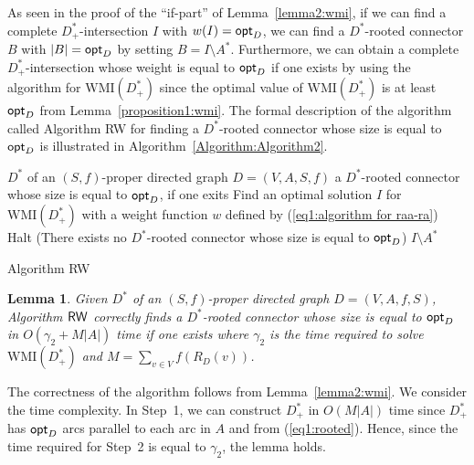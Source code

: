\documentclass[11pt]{article}
\newcounter{ni}
\theoremstyle{plain}
\newtheorem{lemma}[theorem]{Lemma}\newtheorem{corollary}[theorem]{Corollary}\newtheorem{definition}[theorem]{Definition}\newtheorem{proposition}[theorem]{Proposition}\newtheorem{claim}[theorem]{Claim}\newtheorem{fact}[theorem]{Fact}\newtheorem{example}{Example}
\newcommand{\eop}{\hfill \usebox{\ProofSym}}
\newenvironment{proof}{\noindent {\it Proof.}}{\eop\par\vspace{0.3cm}}
\begin{document}
As seen in the proof of the ``if-part'' of Lemma~\ref{lemma2:wmi}, 
if we can find a complete $D_+^{\ast}$-intersection $I$ 
with $w(I) = {\sf opt}_D$, we can find 
a $D^{\ast}$-rooted connector $B$ with $|B|={\sf opt}_D$ 
by setting $B=I\setminus A^{\ast}$. 
Furthermore, we can obtain a complete $D_+^{\ast}$-intersection 
whose weight is equal to ${\sf opt}_D$ if one exists by using the algorithm for $\mbox{WMI}(D_+^{\ast})$
since the optimal value of $\mbox{WMI}(D_+^{\ast})$ is at least ${\sf opt}_D$ 
from Lemma~\ref{proposition1:wmi}. The formal description of the algorithm 
called Algorithm {\sf RW}
for finding a $D^{\ast}$-rooted connector whose size is equal to ${\sf opt}_D$
is illustrated in Algorithm~\ref{Algorithm:Algorithm2}.

\begin{algorithm}[h]
\begin{algorithmic}[1]
\INPUT $D^{\ast}$ of an $(S,f)$-proper directed graph  $D=(V,A,S,f)$
\OUTPUT a $D^{\ast}$-rooted connector whose size is equal to ${\sf opt}_D$, if one exits
\STATE Find an optimal solution $I$ for $\mbox{WMI}(D_+^{\ast})$ 
with a weight function $w$ defined by (\ref{eq1:algorithm for raa-ra})\\
\STATE Halt (There exists no $D^{\ast}$-rooted connector whose size is equal to ${\sf opt}_D$)
\ENDIF 
\RETURN $I\setminus A^{\ast}$
\end{algorithmic}
\caption{Algorithm {\sf RW}}
\label{Algorithm:Algorithm2}
\end{algorithm}

\begin{lemma} \label{lemma2:computation}
Given $D^{\ast}$ of an $(S,f)$-proper directed graph $D=(V,A,f,S)$, Algorithm ${\sf RW}$ correctly 
finds a $D^{\ast}$-rooted connector whose size is equal to ${\sf opt}_D$
in $O(\gamma_2 + M|A|)$ time if one exists where 
$\gamma_2$ is the time required to solve $\mbox{WMI}(D_+^{\ast})$ and 
$M=\sum_{v \in V}f(R_D(v))$.
\end{lemma}
\begin{proof}
The correctness of the algorithm follows from Lemma~\ref{lemma2:wmi}. We consider the time 
complexity. In Step~1, we can construct $D^{\ast}_+$ in $O(M|A|)$ time 
since $D_+^{\ast}$ has ${\sf opt}_D$ arcs 
parallel to each arc in $A$ and from (\ref{eq1:rooted}). 
Hence, since the time required for Step~2 is equal to $\gamma_2$,
the lemma holds.  
\end{proof}
\end{document}
